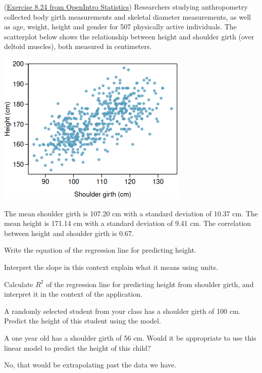 \documentclass[12pt]{exam}
\begin{document}
\begin{questions}
\question (\href{http://people.hsc.edu/faculty-staff/blins/books/OpenIntroStats4e.pdf\#eoce.8.24}{Exercise 8.24 from OpenIntro Statistics}) Researchers studying anthropometry collected body girth measurements
and skeletal diameter measurements, as well as age, weight, height and gender for 507 physically active
individuals. The scatterplot below shows the relationship between height and shoulder girth (over deltoid
muscles), both measured in centimeters. 
\begin{center}
\includegraphics[scale=0.6]{girth.png}
\end{center}
The mean shoulder girth is 107.20 cm with a standard deviation of 10.37 cm. The mean
height is 171.14 cm with a standard deviation of 9.41 cm. The correlation between height and shoulder girth
is 0.67.
\begin{parts}
\item Write the equation of the regression line for predicting height.
\begin{solution}
\end{solution}
\bigskip

\item Interpret the slope in this context explain what it means using units.
\begin{solution}
\end{solution}
\bigskip

\item Calculate $R^2$ of the regression line for predicting height from shoulder girth, and interpret it in the context of the application.
\begin{solution}
\end{solution}
\bigskip

\item A randomly selected student from your class has a shoulder girth of 100 cm. Predict the height of this student using the model.
\begin{solution}
\end{solution}
\bigskip

\item A one year old has a shoulder girth of 56 cm. Would it be appropriate to use this linear model to predict the height of this child?
\begin{solution}
No, that would be extrapolating past the data we have. 
\end{solution}
\bigskip

\end{parts}

\end{questions}
\end{document}
